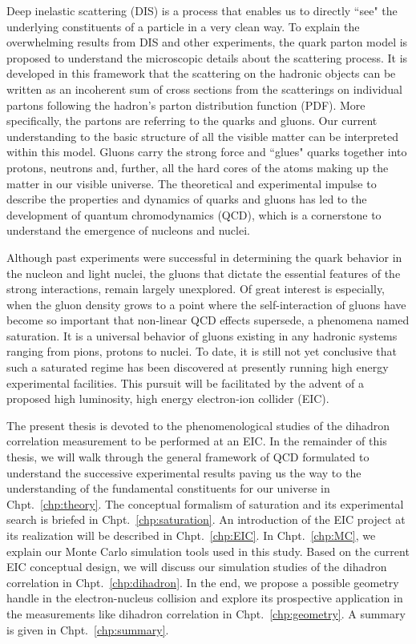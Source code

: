 Deep inelastic scattering (DIS) is a process that enables us to directly ``see"
the underlying constituents of a particle in a very clean way. To explain the
overwhelming results from DIS and other experiments, the quark parton model is
proposed to understand the microscopic details about the scattering process. It
is developed in this framework that the scattering on the hadronic objects can
be written as an incoherent sum of cross sections from the scatterings on
individual partons following the hadron's parton distribution function (PDF).
More specifically, the partons are referring to the quarks and gluons. Our
current understanding to the basic structure of all the visible matter can be
interpreted within this model. Gluons carry the strong force and
``glues" quarks together into protons, neutrons and, further, all the hard
cores of the atoms making up the matter in our visible universe. The theoretical
and experimental impulse to describe the properties and dynamics of quarks and
gluons has led to the development of quantum chromodynamics (QCD), which is a
cornerstone to understand the emergence of nucleons and nuclei.


Although past experiments were successful in determining the quark behavior in
the nucleon and light nuclei, the gluons that dictate the essential features
of the strong interactions, remain largely unexplored. Of great interest is
especially, when the gluon density grows to a point where the self-interaction
of gluons have become so important that non-linear QCD effects supersede, a
phenomena named saturation. It is a universal behavior of gluons existing in any
hadronic systems ranging from pions, protons to nuclei. To date, it is still not
yet conclusive that such a saturated regime has been discovered at presently
running high energy experimental facilities. This pursuit will be facilitated by
the advent of a proposed high luminosity, high energy electron-ion collider (EIC).


The present thesis is devoted to the phenomenological studies of the dihadron
correlation measurement to be performed at an EIC. In the remainder of this
thesis, we will walk through the general framework of QCD formulated to
understand the successive experimental results paving us the way to the
understanding of the fundamental constituents for our universe in
Chpt.~\ref{chp:theory}. The conceptual formalism of saturation and its
experimental search is briefed in Chpt.~\ref{chp:saturation}. An
introduction of the EIC project at its realization will be described in
Chpt.~\ref{chp:EIC}. In Chpt.~\ref{chp:MC}, we explain our Monte Carlo
simulation tools used in this study. Based on the current EIC conceptual design,
we will discuss our simulation studies of the dihadron correlation in Chpt.~\ref{chp:dihadron}. In the end, we propose a possible geometry
handle in the electron-nucleus collision and explore its prospective
application in the measurements like dihadron correlation in
Chpt.~\ref{chp:geometry}. A summary is given in Chpt.~\ref{chp:summary}.

